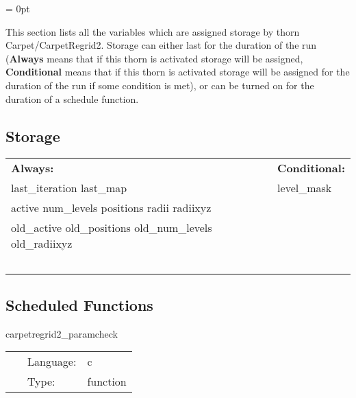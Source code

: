 \parskip = 0pt


\noindent This section lists all the variables which are assigned storage by thorn Carpet/CarpetRegrid2.  Storage can either last for the duration of the run ({\bf Always} means that if this thorn is activated storage will be assigned, {\bf Conditional} means that if this thorn is activated storage will be assigned for the duration of the run if some condition is met), or can be turned on for the duration of a schedule function.


\subsection*{Storage}

\hspace{5mm}

 \begin{tabular*}{160mm}{ll} 

{\bf Always:}& {\bf Conditional:} \\ 
 last\_iteration last\_map &  level\_mask\\ 
 active num\_levels positions radii radiixyz & ~\\ 
 old\_active old\_positions old\_num\_levels old\_radiixyz & ~\\ 
~ & ~\\ 
\end{tabular*} 


\subsection*{Scheduled Functions}
\vspace{5mm}


\hspace{5mm} carpetregrid2\_paramcheck 

\hspace{5mm}{\it check parameters } 


\hspace{5mm}

 \begin{tabular*}{160mm}{cll} 
~ & Language:  & c \\ 
~ & Type:  & function \\ 
\end{tabular*} 


\vspace{5mm}


